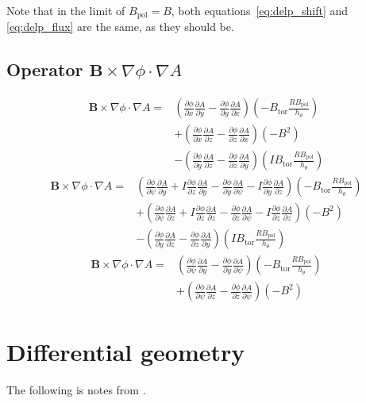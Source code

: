 \documentclass[12pt]{article}
\def\L{\left}
\def\R{\right}
\newcommand{\deriv}[2]{\ensuremath{\frac{\partial #1}{\partial #2}}}
\newcommand{\hthe}{\ensuremath{h_\theta}}
\newcommand{\Bp}{\ensuremath{B_{\text{pol}}}}
\newcommand{\Bt}{\ensuremath{B_{\text{tor}}}}
\newcommand{\ve}[1]{\ensuremath{\boldsymbol{#1}}}
\newcommand{\Bvec}{\ve{B}}
\newcommand{\rbp}{\ensuremath{R\Bp}}
\begin{document}
Note that in the limit of $\Bp = B$, both equations~\ref{eq:delp_shift} and
\ref{eq:delp_flux} are the same, as they should be.



\subsection{Operator \texorpdfstring{$\Bvec\times\nabla\phi\cdot\nabla A$}
%
{B x Nabla Phi Dot Nabla A}}
%
\begin{align*}
\Bvec\times\nabla\phi\cdot\nabla A =& \L(\deriv{\phi}{x}\deriv{A}{y} -
\deriv{\phi}{y}\deriv{A}{x}\R)\L(-\Bt\frac{\rbp}{\hthe}\R) \\ &+
    \L(\deriv{\phi}{x}\deriv{A}{z} -
    \deriv{\phi}{z}\deriv{A}{x}\R)\L(-B^2\R) \\ &-
        \L(\deriv{\phi}{y}\deriv{A}{z} -
        \deriv{\phi}{z}\deriv{A}{y}\R)\L(I\Bt\frac{\rbp}{\hthe}\R)
\end{align*}
%
\begin{align*}
\Bvec\times\nabla\phi\cdot\nabla A =& \L(\deriv{\phi}{\psi}\deriv{A}{y} + I
\deriv{\phi}{z}\deriv{A}{y} - \deriv{\phi}{y}\deriv{A}{\psi} -
I\deriv{\phi}{y}\deriv{A}{z}\R)\L(-\Bt\frac{\rbp}{\hthe}\R) \\ &+
\L(\deriv{\phi}{\psi}\deriv{A}{z} + I\deriv{\phi}{z}\deriv{A}{z} -
\deriv{\phi}{z}\deriv{A}{\psi} -
I\deriv{\phi}{z}\deriv{A}{z}\R)\L(-B^2\R) \\ &-
\L(\deriv{\phi}{y}\deriv{A}{z} -
\deriv{\phi}{z}\deriv{A}{y}\R)\L(I\Bt\frac{\rbp}{\hthe}\R)
\end{align*}
%
\begin{align*}
\Bvec\times\nabla\phi\cdot\nabla A =& \L(\deriv{\phi}{\psi}\deriv{A}{y} -
\deriv{\phi}{y}\deriv{A}{\psi}\R)\L(-\Bt\frac{\rbp}{\hthe}\R)
\nonumber \\ &+ \L(\deriv{\phi}{\psi}\deriv{A}{z} -
\deriv{\phi}{z}\deriv{A}{\psi} \R)\L(-B^2\R)
\end{align*}
%
 

\appendix





\section{Differential geometry}
%
The following is notes from \cite{hazeltine-2003}.
\end{document}
